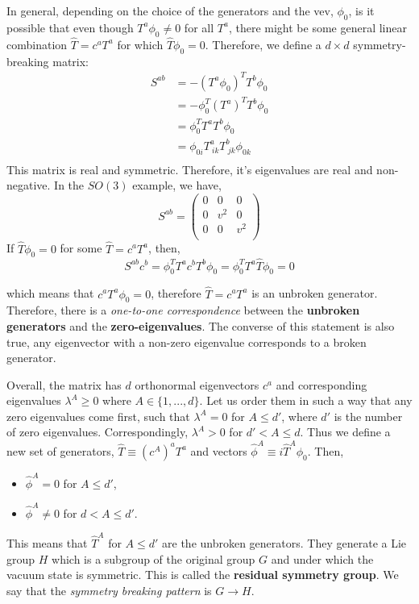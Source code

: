 In general, depending on the choice of the generators and the vev, $\phi_0$, is it possible that even though $T^a\phi_0\neq 0$ for all $T^a$, there might be some general linear combination $\hat{T} = c^aT^a$ for which $\hat{T}\phi_0=0$. Therefore, we define a $d\times d$ symmetry-breaking matrix: 
\begin{equation}
\begin{split}
    S^{ab} &= -(T^a\phi_0)^TT^b\phi_0\\
    &=-\phi_0^T(T^a)^TT^b\phi_0\\
    &=\phi_0^TT^aT^b\phi_0\\
    &=\phi_{0i}T^a_{\ ik}T^b_{\ jk}\phi_{0k}\\
\end{split}
\end{equation}
This matrix is real and symmetric. Therefore, it's eigenvalues are real and non-negative. 
In the $SO(3)$ example, we have, 
\begin{equation}
    S^{ab} = 
\begin{pmatrix}
0 & 0 & 0\\
0 & v^2 & 0\\
0 & 0 & v^2\\
\end{pmatrix}
\end{equation}
If $\hat{T}\phi_0=0$ for some $\hat{T}=c^aT^a$, then,
\begin{equation}
    S^{ab}c^b = \phi_0^TT^ac^bT^b\phi_0 = \phi_0^TT^a\hat{T}\phi_0 = 0
\end{equation}

which means that $c^aT^a\phi_0=0$, therefore $\hat{T} = c^aT^a$ is an unbroken generator. Therefore, there is a \textit{one-to-one correspondence} between the \textbf{unbroken generators} and the \textbf{zero-eigenvalues}. The converse of this statement is also true, any eigenvector with a non-zero eigenvalue corresponds to a broken generator. 

Overall, the matrix has $d$ orthonormal eigenvectors $c^a$ and corresponding eigenvalues $\lambda^A\geq 0$ where $A\in\{1,...,d\}$. Let us order them in such a way that any zero eigenvalues come first, such that $\lambda^A = 0$ for $A\leq d'$, where $d'$ is the number of zero eigenvalues. Correspondingly, $\lambda^A > 0$ for $d'<A\leq d$. Thus we define a new set of generators, 
$\hat{T} \equiv (c^A)^aT^a$ and vectors $\hat{\phi}^A\equiv i\hat{T}^A\phi_0$. Then, 
\begin{itemize}
    \item $\hat{\phi}^A=0$ for $A\leq d'$, 
    \item $\hat{\phi}^A\neq0$ for $d<A\leq d'$.  
\end{itemize}
This means that $\hat{T}^A$ for $A\leq d'$ are the unbroken generators. They generate a Lie group $H$ which is a subgroup of the original group $G$ and under which the vacuum state is symmetric. This is called the \textbf{residual symmetry group}. We say that the \textit{symmetry breaking pattern} is $G\rightarrow H$.

